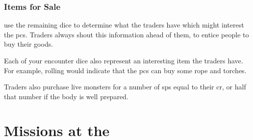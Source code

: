 \begin{multicols}{2}
\subsubsection{Items for Sale}
\label{traders}
use the remaining dice to determine what the traders have which might interest the \glspl{pc}.
Traders always shout this information ahead of them, to entice people to buy their goods.

\encTraders

Each of your encounter dice also represent an interesting item the traders have.
For example, rolling  would indicate that the \glspl{pc} can buy some rope and torches.

Traders also purchase live \glspl{monster} for a number of \glspl{sp} equal to their \gls{cr}, or half that number if the body is well prepared.


\end{multicols}

\setCycle{\month}{\day}

\section{Missions at the }
\label{NGmissions}

